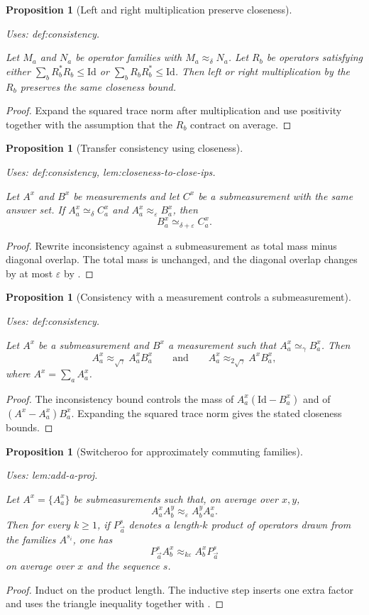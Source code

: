 \documentclass{article}
\providecommand{\uses}[1]{\par\smallskip\noindent\emph{Uses:} #1.\par\smallskip}
\newtheorem{proposition}[definition]{Proposition}
\theoremstyle{remark}
\newcommand{\id}{\mathrm{Id}}
\newcommand{\eps}{\varepsilon}
\begin{document}
\begin{proposition}[Left and right multiplication preserve closeness]\label{lem:add-a-proj}
  \uses{def:consistency}
  Let $M_a$ and $N_a$ be operator families with $M_a\approx_\delta N_a$. Let $R_b$ be operators satisfying either $\sum_b R_b^*R_b\le \id$ or $\sum_b R_bR_b^*\le \id$. Then left or right multiplication by the $R_b$ preserves the same closeness bound.
\end{proposition}
\begin{proof}
  Expand the squared trace norm after multiplication and use positivity together with the assumption that the $R_b$ contract on average.
\end{proof}

\begin{proposition}[Transfer consistency using closeness]\label{lem:transfer-cons}
  \uses{def:consistency, lem:closeness-to-close-ips}
  Let $A^x$ and $B^x$ be measurements and let $C^x$ be a submeasurement with the same answer set. If $A^x_a\simeq_\delta C^x_a$ and $A^x_a\approx_\eps B^x_a$, then
  \[
    B^x_a\simeq_{\delta+\eps} C^x_a.
  \]
\end{proposition}
\begin{proof}
  Rewrite inconsistency against a submeasurement as total mass minus diagonal overlap. The total mass is unchanged, and the diagonal overlap changes by at most $\eps$ by .
\end{proof}

\begin{proposition}[Consistency with a measurement controls a submeasurement]\label{lem:cons-sub-meas}
  \uses{def:consistency}
  Let $A^x$ be a submeasurement and $B^x$ a measurement such that $A^x_a\simeq_\gamma B^x_a$. Then
  \[
    A^x_a\approx_{\sqrt\gamma} A^x_aB^x_a
    \qquad\text{and}\qquad
    A^x_a\approx_{2\sqrt\gamma} A^xB^x_a,
  \]
  where $A^x=\sum_a A^x_a$.
\end{proposition}
\begin{proof}
  The inconsistency bound controls the mass of $A^x_a(\id-B^x_a)$ and of $(A^x-A^x_a)B^x_a$. Expanding the squared trace norm gives the stated closeness bounds.
\end{proof}

\begin{proposition}[Switcheroo for approximately commuting families]\label{lem:switcheroo}
  \uses{lem:add-a-proj}
  Let $A^x=\{A^x_a\}$ be submeasurements such that, on average over $x,y$,
  \[
    A^x_aA^y_b\approx_\eps A^y_bA^x_a.
  \]
  Then for every $k\ge 1$, if $P^s_{\vec a}$ denotes a length-$k$ product of operators drawn from the families $A^{s_i}$, one has
  \[
    P^s_{\vec a}A^x_b\approx_{k\eps} A^x_bP^s_{\vec a}
  \]
  on average over $x$ and the sequence $s$.
\end{proposition}
\begin{proof}
  Induct on the product length. The inductive step inserts one extra factor and uses the triangle inequality together with .
\end{proof}
\end{document}
